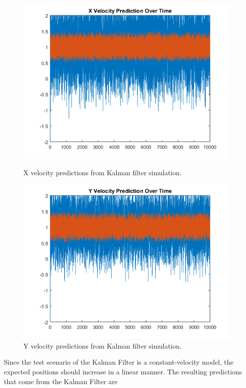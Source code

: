 \begin{figure}[ht!]
\begin{minipage}{.5\textwidth}
  \centering
\includegraphics[scale=0.5]{img/kf_xvel.png}
\caption{X velocity predictions from Kalman filter simulation.}
\label{fig:kf_xpos}
\end{minipage}
\begin{minipage}{0.5\textwidth}
\centering
\includegraphics[scale=0.5]{img/kf_yvel.png}
\caption{Y velocity predictions from Kalman filter simulation.}
\label{fig:kf_ypos}
\end{minipage}
\end{figure}\par
Since the test scenario of the Kalman Filter is a constant-velocity model, the expected positions should increase in a linear manner. The resulting predictions that come from the Kalman Filter are
